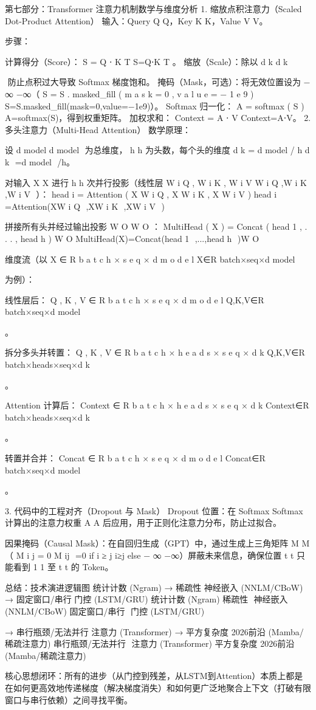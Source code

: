第七部分：Transformer 注意力机制数学与维度分析
1. 缩放点积注意力（Scaled Dot-Product Attention）
输入：Query 
Q
Q，Key 
K
K，Value 
V
V。

步骤：

计算得分（Score）：
S
=
Q
⋅
K
T
S=Q⋅K 
T
 。
缩放（Scale）：除以 
d
k
d 
k
​
 
​
  防止点积过大导致 Softmax 梯度饱和。
掩码（Mask，可选）：将无效位置设为 
−
∞
−∞（
S
=
S
.
masked_fill
(
m
a
s
k
=
0
,
v
a
l
u
e
=
−
1
e
9
)
S=S.masked_fill(mask=0,value=−1e9)）。
Softmax 归一化：
A
=
softmax
(
S
)
A=softmax(S)，得到权重矩阵。
加权求和：
Context
=
A
⋅
V
Context=A⋅V。
2. 多头注意力（Multi-Head Attention）
数学原理：

设 
d
model
d 
model
​
  为总维度，
h
h 为头数，每个头的维度 
d
k
=
d
model
/
h
d 
k
​
 =d 
model
​
 /h。

对输入 
X
X 进行 
h
h 次并行投影（线性层 
W
i
Q
,
W
i
K
,
W
i
V
W 
i
Q
​
 ,W 
i
K
​
 ,W 
i
V
​
 ）：
head
i
=
Attention
(
X
W
i
Q
,
X
W
i
K
,
X
W
i
V
)
head 
i
​
 =Attention(XW 
i
Q
​
 ,XW 
i
K
​
 ,XW 
i
V
​
 )

拼接所有头并经过输出投影 
W
O
W 
O
 ：
MultiHead
(
X
)
=
Concat
(
head
1
,
.
.
.
,
head
h
)
W
O
MultiHead(X)=Concat(head 
1
​
 ,...,head 
h
​
 )W 
O
 

维度流（以 
X
∈
R
b
a
t
c
h
×
s
e
q
×
d
m
o
d
e
l
X∈R 
batch×seq×d 
model
​
 
  为例）：

线性层后：
Q
,
K
,
V
∈
R
b
a
t
c
h
×
s
e
q
×
d
m
o
d
e
l
Q,K,V∈R 
batch×seq×d 
model
​
 
 。

拆分多头并转置：
Q
,
K
,
V
∈
R
b
a
t
c
h
×
h
e
a
d
s
×
s
e
q
×
d
k
Q,K,V∈R 
batch×heads×seq×d 
k
​
 
 。

Attention 计算后：
Context
∈
R
b
a
t
c
h
×
h
e
a
d
s
×
s
e
q
×
d
k
Context∈R 
batch×heads×seq×d 
k
​
 
 。

转置并合并：
Concat
∈
R
b
a
t
c
h
×
s
e
q
×
d
m
o
d
e
l
Concat∈R 
batch×seq×d 
model
​
 
 。

3. 代码中的工程对齐（Dropout 与 Mask）
Dropout 位置：在 
Softmax
Softmax 计算出的注意力权重 
A
A 后应用，用于正则化注意力分布，防止过拟合。

因果掩码（Causal Mask）：在自回归生成（GPT）中，通过生成上三角矩阵 
M
M（
M
i
j
=
0
M 
ij
​
 =0 if 
i
≥
j
i≥j else 
−
∞
−∞）屏蔽未来信息，确保位置 
t
t 只能看到 
1
1 至 
t
t 的 Token。

总结：技术演进逻辑图
统计计数 (Ngram)
→
稀疏性
神经嵌入 (NNLM/CBoW)
→
固定窗口/串行
门控 (LSTM/GRU)
统计计数 (Ngram) 
稀疏性
​
 神经嵌入 (NNLM/CBoW) 
固定窗口/串行
​
 门控 (LSTM/GRU)

→
串行瓶颈/无法并行
注意力 (Transformer)
→
平方复杂度
2026前沿 (Mamba/稀疏注意力)
串行瓶颈/无法并行
​
 注意力 (Transformer) 
平方复杂度
​
 2026前沿 (Mamba/稀疏注意力)

核心思想闭环：所有的进步（从门控到残差，从LSTM到Attention）本质上都是在如何更高效地传递梯度（解决梯度消失）和如何更广泛地聚合上下文（打破有限窗口与串行依赖）之间寻找平衡。